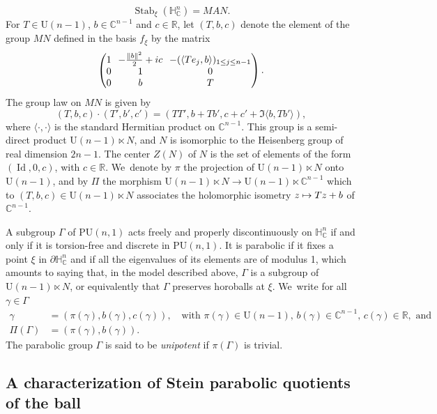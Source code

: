 \documentclass[11pt]{article}
\newcommand\mto{\mathchoice{\longmapsto}{\mapsto}{\mapsto}{\mapsto}}
\theoremstyle{definition}
\newcommand{\C}{\mathbb{C}}
\newcommand{\R}{\mathbb{R}}
\newcommand{\HNC}{\mathbb{H}^{n}_{\C}}
\newcommand{\PHNC}{\partial\mathbb{H}^{n}_{\C}}
\newcommand{\PU}{\mathrm{PU}}
\DeclareMathOperator{\Id}{Id}
\def\C{\mathbb{C}}
\newcommand{\HNC}{\mathbb{H}^{n}_{\C}}
\newcommand{\PU}{\mathrm{PU}}
\begin{document}
\begin{equation*}
\operatorname{Stab}_{\xi}(\HNC)= MAN.
\end{equation*}
For $T\in \mathrm{U}(n-1)$, $b\in \C^{n-1}$ and $c\in \R$, let $(T,b,c)$ denote the element of the group $MN$ defined in the basis $f_{\xi}$ by the matrix
\begin{equation*}
\arraycolsep3.5pt\begin{pmatrix}
1 & -\frac{\lVert b\rVert^{2}}{2}+ic & -(\langle Te_j,b\rangle)_{1\le j\le n-1} \\
0 & 1 & 0 \\
0 & b & T
\end{pmatrix}.
\end{equation*}
The group law on $MN$ is given by
\begin{equation*}
(T,b,c)\cdot(T',b',c') = (TT',b+Tb',c+c'+\Im\langle b,Tb' \rangle),
\end{equation*}
where $\langle\cdot,\cdot\rangle$ is the standard Hermitian product on $\C^{n-1}$. This group is a semi-direct product $\mathrm{U}(n-1)\ltimes N$, and $N$ is isomorphic to the Heisenberg group of real dimension $2n-1$. The center $Z(N)$ of $N$ is the set of elements of the form $(\Id,0,c)$, with $c\in \R$. We~denote by $\pi$ the projection of $\mathrm{U}(n-1)\ltimes N$ onto $\mathrm{U}(n-1)$, and by $\Pi$ the morphism $\mathrm{U}(n-1)\ltimes N \to \mathrm{U}(n-1)\ltimes \C^{n-1}$ which to $(T,b,c)\in \mathrm{U}(n-1)\ltimes N$ associates the holomorphic isometry $z\mto Tz+b$ of $\C^{n-1}$.

A subgroup $\Gamma$ of $\PU(n,1)$ acts freely and properly discontinuously on $\HNC$ if and only if it is torsion-free and discrete in $\PU(n,1)$. It is parabolic if it fixes a point $\xi$ in $\PHNC$ and if all the eigenvalues of its elements are of modulus 1, which amounts to saying that, in the model described above, $\Gamma$ is a subgroup of $\mathrm{U}(n-1)\ltimes N$, or equivalently that $\Gamma$ preserves horoballs at $\xi$. We~write for all $\gamma\in \Gamma$
\begin{align*}
\gamma &= (\pi(\gamma),b(\gamma),c(\gamma)),\quad \text{with } \pi(\gamma)\in \mathrm{U}(n-1),\,b(\gamma)\in \C^{n-1},\,c(\gamma)\in \R, \text{ and }\\
\Pi(\Gamma) &= (\pi(\gamma),b(\gamma)).
\end{align*}
The parabolic group $\Gamma$ is said to be \textit{unipotent} if $\pi(\Gamma)$ is trivial.

\subsection{A characterization of Stein parabolic quotients of the ball}
\end{document}
